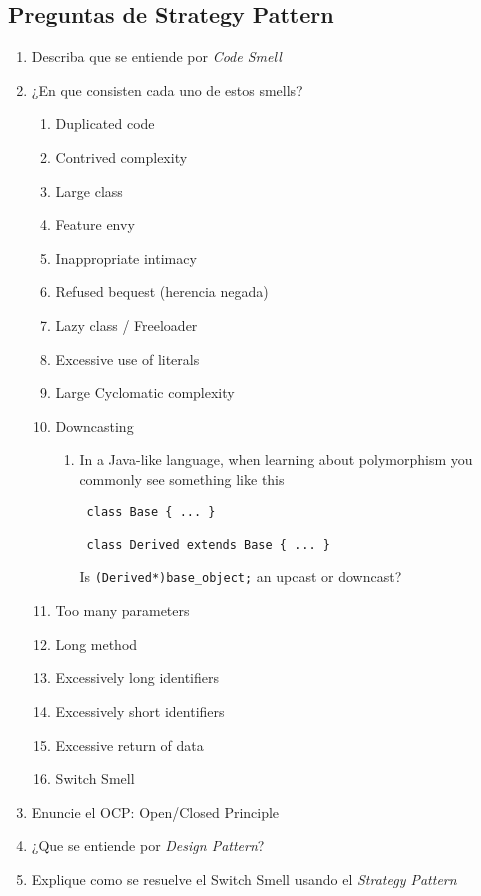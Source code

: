\subsection{Preguntas de Strategy
Pattern}\label{preguntas-de-strategy-pattern}

\begin{enumerate}
\def\labelenumi{\arabic{enumi}.}
\item
  Describa que se entiende por \emph{Code Smell}
\item
  ¿En que consisten cada uno de estos smells?

  \begin{enumerate}
  \def\labelenumii{\arabic{enumii}.}
  \itemsep1pt\parskip0pt
  \item
    Duplicated code
  \item
    Contrived complexity
  \item
    Large class
  \item
    Feature envy
  \item
    Inappropriate intimacy
  \item
    Refused bequest (herencia negada)
  \item
    Lazy class / Freeloader
  \item
    Excessive use of literals
  \item
    Large Cyclomatic complexity
  \item
    Downcasting

    \begin{enumerate}
    \def\labelenumiii{\arabic{enumiii}.}
    \item
      In a Java-like language, when learning about polymorphism you
      commonly see something like this

\begin{verbatim}
 class Base { ... }

 class Derived extends Base { ... }
\end{verbatim}

      Is \texttt{(Derived*)base\_object;} an upcast or downcast?
    \end{enumerate}
  \item
    Too many parameters
  \item
    Long method
  \item
    Excessively long identifiers
  \item
    Excessively short identifiers
  \item
    Excessive return of data
  \item
    Switch Smell
  \end{enumerate}
\item
  Enuncie el OCP: Open/Closed Principle
\item
  ¿Que se entiende por \emph{Design Pattern}?
\item
  Explique como se resuelve el Switch Smell usando el \emph{Strategy
  Pattern}
\end{enumerate}
